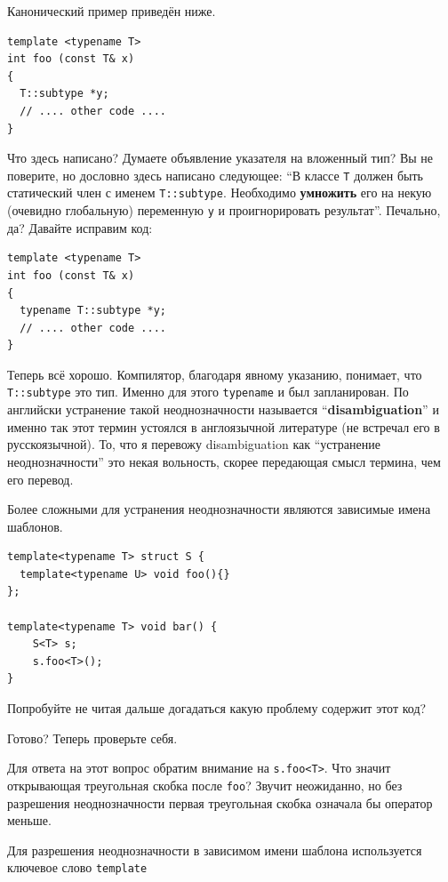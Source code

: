 \documentclass[a4paper,12pt,oneside]{book}
\begin{document}
Канонический пример приведён ниже.

\begin{lstlisting}
template <typename T>
int foo (const T& x)
{
  T::subtype *y;
  // .... other code ....
}
\end{lstlisting}

Что здесь написано? Думаете объявление указателя на вложенный тип? Вы не поверите, но дословно здесь написано 
следующее: ``В классе \lstinline!T! должен быть статический член с именем \lstinline!T::subtype!. Необходимо \textbf{умножить} его на некую (очевидно глобальную) переменную \lstinline!y! и проигнорировать результат''. Печально, да? Давайте исправим код:

\begin{lstlisting}
template <typename T>
int foo (const T& x)
{
  typename T::subtype *y;
  // .... other code ....
}
\end{lstlisting}

Теперь всё хорошо. Компилятор, благодаря явному указанию, понимает, что \lstinline!T::subtype! это тип. Именно для этого \lstinline!typename! и был запланирован. По английски устранение такой неоднозначности называется ``\textbf{disambiguation}''  и именно так этот термин устоялся в англоязычной литературе (не встречал его в русскоязычной). То, что я перевожу disambiguation как ``устранение неоднозначности'' это некая вольность, скорее передающая смысл термина, чем его перевод.

Более сложными для устранения неоднозначности являются зависимые имена шаблонов.

\begin{lstlisting}
template<typename T> struct S {
  template<typename U> void foo(){}
};

template<typename T> void bar() {
    S<T> s;
    s.foo<T>();
}
\end{lstlisting}

Попробуйте не читая дальше догадаться какую проблему содержит этот код?

Готово? Теперь проверьте себя.

Для ответа на этот вопрос обратим внимание на \lstinline!s.foo<T>!. Что значит открывающая треугольная скобка после \lstinline!foo!? Звучит неожиданно, но без разрешения неоднозначности первая треугольная скобка означала бы оператор меньше.

Для разрешения неоднозначности в зависимом имени шаблона используется ключевое слово \lstinline!template!
\end{document}
